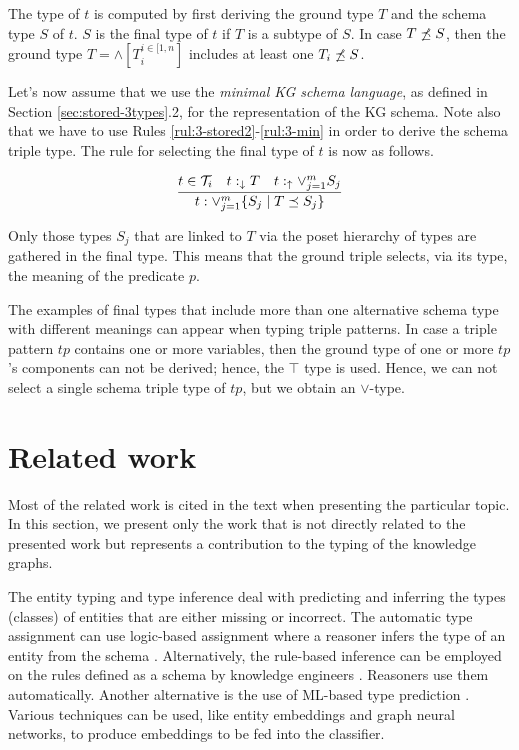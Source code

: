 \documentclass[runningheads]{llncs}
\newcommand{\darr}{\downarrow}
\newcommand{\uarr}{\uparrow}
\newcommand{\T}{{\cal T}}
\begin{document}
The type of $t$ is computed by first deriving the ground type $T$ and
the schema type $S$ of $t$. $S$ is the final type of $t$ if $T$ is a
subtype of $S$. In case $T\not\preceq\/S$, then the ground type
$T=\land[T_i^{i\in[1,n}]$ includes at least one $T_i\not\preceq\/S$.

Let's now assume that we use the \emph{minimal KG schema language}, as
defined in Section \ref{sec:stored-3types}.2, for the representation
of the KG schema. Note also that we have to use Rules
\ref{rul:3-stored2}-\ref{rul:3-min} in order to derive the schema
triple type. The rule for selecting the final type of $t$ is now as
follows.

\begin{equation}
\label{rul:3-typing-two}
\dfrac{t\in\T_i\quad t:_{\darr}T\quad\/t:_\uarr\lor_{j=1}^{m}\/S_j}
      {t:\lor_{j=1}^m\{S_j \mid T\preceq\/S_j\}}
\end{equation}

Only those types $S_j$ that are linked to $T$ via the poset hierarchy
of types are gathered in the final type. This means that the ground
triple selects, via its type, the meaning of the predicate $p$.

The examples of final types that include more than one alternative
schema type with different meanings can appear when typing triple
patterns. In case a triple pattern $tp$ contains one or more
variables, then the ground type of one or more $tp$'s components can
not be derived; hence, the $\top$ type is used. Hence, we can not
select a single schema triple type of $tp$, but we obtain an
$\lor$-type.






\section{Related work\label{sec:related}}

Most of the related work is cited in the text when presenting the
particular topic. In this section, we present only the work that is not
directly related to the presented work but represents a contribution
to the typing of the knowledge graphs.

The entity typing and type inference deal with predicting and
inferring the types (classes) of entities that are either missing or
incorrect. The automatic type assignment can use logic-based
assignment where a reasoner infers the type of an entity from the
schema \cite{Horrocks2003}. Alternatively, the rule-based inference
can be employed on the rules defined as a schema by knowledge
engineers \cite{Horrocks2004}. Reasoners use them
automatically. Another alternative is the use of ML-based type
prediction \cite{Yaghoobzadeh2018}. Various techniques can be used,
like entity embeddings and graph neural networks, to produce
embeddings to be fed into the classifier.
\end{document}
